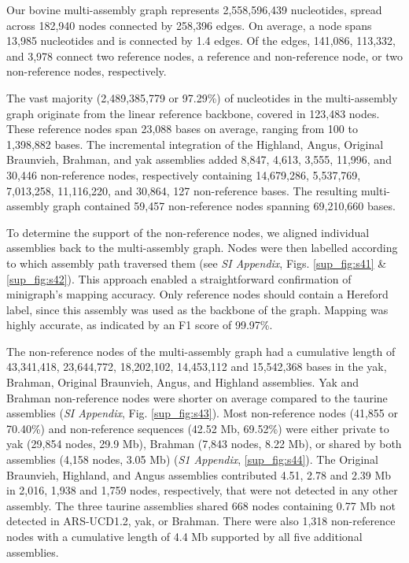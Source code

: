 \documentclass[../main.tex]{subfiles}
\begin{document}
Our bovine multi-assembly graph represents 2,558,596,439 nucleotides, spread across 182,940 nodes connected by 258,396 edges. On average, a node spans 13,985 nucleotides and is connected by 1.4 edges. Of the edges, 141,086, 113,332, and 3,978 connect two reference nodes, a reference and non-reference node, or two non-reference nodes, respectively. 

The vast majority (2,489,385,779 or 97.29\%) of nucleotides in the multi-assembly graph originate from the linear reference backbone, covered in 123,483 nodes. These reference nodes span 23,088 bases on average, ranging from 100 to 1,398,882 bases. The incremental integration of the Highland, Angus, Original Braunvieh, Brahman, and yak assemblies added 8,847, 4,613, 3,555, 11,996, and 30,446 non-reference nodes, respectively containing 14,679,286, 5,537,769, 7,013,258, 11,116,220, and 30,864,
127 non-reference bases. The resulting multi-assembly graph contained 59,457 non-reference nodes spanning 69,210,660 bases. 

To determine the support of the non-reference nodes, we aligned individual assemblies back to the multi-assembly graph. Nodes were then labelled according to which assembly path traversed them (see \emph{SI Appendix}, Figs. \ref{sup_fig:s41} \& \ref{sup_fig:s42}). This approach enabled a straightforward confirmation of minigraph’s mapping accuracy. Only reference nodes should contain a Hereford label, since this assembly was used as the backbone of the graph. Mapping was highly accurate, as indicated by an F1 score of 99.97\%.

The non-reference nodes of the multi-assembly graph had a cumulative length of 43,341,418, 23,644,772, 18,202,102, 14,453,112 and 15,542,368 bases in the yak, Brahman, Original Braunvieh, Angus, and Highland assemblies. Yak and Brahman non-reference nodes were shorter on average compared to the taurine assemblies (\emph{SI Appendix}, Fig. \ref{sup_fig:s43}). Most non-reference nodes (41,855 or 70.40\%) and non-reference sequences (42.52 Mb, 69.52\%) were either private to yak (29,854 nodes, 29.9 Mb), Brahman (7,843 nodes, 8.22 Mb), or shared by both assemblies (4,158 nodes, 3.05 Mb) (\emph{S1 Appendix}, \ref{sup_fig:s44}). The Original Braunvieh, Highland, and Angus assemblies contributed 4.51, 2.78 and 2.39 Mb in 2,016, 1,938 and 1,759 nodes, respectively, that were not detected in any other assembly. The three taurine assemblies shared 668 nodes containing 0.77 Mb not detected in ARS-UCD1.2, yak, or Brahman. There were also 1,318 non-reference nodes with a cumulative length of 4.4 Mb supported by all five additional assemblies.
\end{document}
